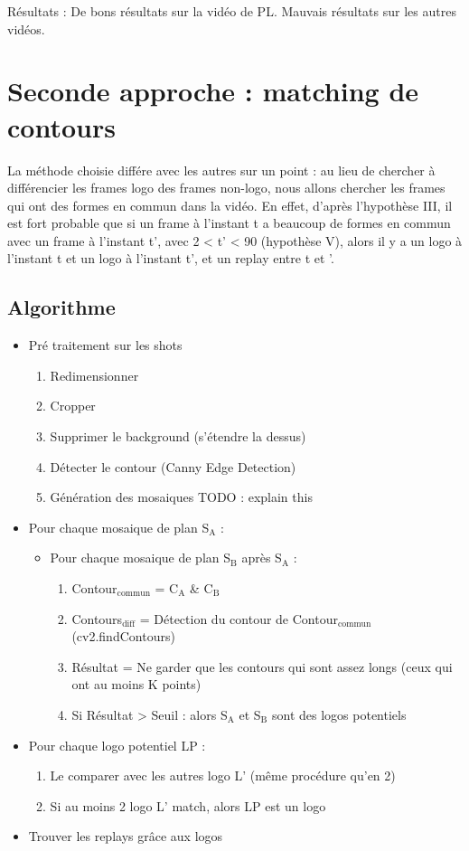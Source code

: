 \documentclass[11pt]{article}
\begin{document}
Résultats :
De bons résultats sur la vidéo de PL.
Mauvais résultats sur les autres vidéos.


\section{Seconde approche : matching de contours}
\label{sec-7}
La méthode choisie différe avec les autres sur un point : au lieu de chercher
à différencier les frames logo des frames non-logo, nous allons chercher 
les frames qui ont des formes en commun dans la vidéo.
En effet, d'après l'hypothèse III, il est fort probable que si un frame à 
l'instant t a beaucoup de formes en commun avec un frame à l'instant t', avec 
2 < t' < 90 (hypothèse V), alors il y a un logo à l'instant t et un logo à 
l'instant t', et un replay entre t et '.
\subsection{Algorithme}
\label{sec-7-1}
\begin{itemize}
\item Pré traitement sur les shots
\begin{enumerate}
\item Redimensionner
\item Cropper
\item Supprimer le background (s’étendre la dessus)
\item Détecter le contour (Canny Edge Detection)
\item Génération des mosaiques TODO : explain this
\end{enumerate}
\item Pour chaque mosaique de plan S$_{\text{A}}$ :
\begin{itemize}
\item Pour chaque mosaique de plan S$_{\text{B}}$ après S$_{\text{A}}$ :
\begin{enumerate}
\item Contour$_{\text{commun}}$ = C$_{\text{A}}$ \& C$_{\text{B}}$
\item Contours$_{\text{diff}}$ = Détection du contour de Contour$_{\text{commun}}$ (cv2.findContours)
\item Résultat = Ne garder que les contours qui sont assez longs (ceux qui ont au moins K points)
\item Si Résultat > Seuil : alors S$_{\text{A}}$ et S$_{\text{B}}$ sont des logos potentiels
\end{enumerate}
\end{itemize}
\item Pour chaque logo potentiel LP :
\begin{enumerate}
\item Le comparer avec les autres logo L’ (même procédure qu’en 2)
\item Si au moins 2 logo L’  match, alors LP est un logo
\end{enumerate}
\item Trouver les replays grâce aux logos
\end{itemize}
\end{document}
